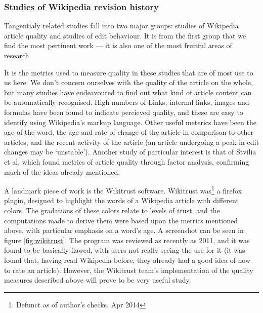 \documentclass[a4paper,11pt,twoside,notitlepage]{article}
\begin{document}
        
        \subsubsection*{Studies of Wikipedia revision history}
        Tangentialy related studies fall into two major groups: studies
        of Wikipedia article quality and studies of edit behaviour.
        It is from the first group that we find the most pertinent
        work --- it is also one of the most fruitful areas of
        research.

        It is the metrics used to measure quality in these studies
        that are of most use to us here. We don't concern ourselves
        with the quality of the article on the whole, but many studies
        have endeavoured to find out what kind of article content can
        be automatically recognised. High numbers of Links, internal
        links, images and formulas have been found to indicate
        percieved quality,\cite{Lucassen2010}\cite{mcguinness2006} and
        these are easy to identify using Wikipedia's markup
        language. Other useful meterics have been the age of the
        word,\cite{Cross2006} the age and rate of change of the
        article in comparison to other articles,\cite{Zeng2006} and
        the recent activity of the article (an article undergoing a
        peak in edit changes may be `unstable').\cite{Adler2006}
        Another study of particular interest is that of Stvilia et al,
        which found metrics of article quality through factor
        analysis,\cite{Stvilia2005} confirming much of the ideas
        already mentioned.

        A landmark piece of work is the Wikitrust
        software.\cite{Adler2007} Wikitrust was\footnote{Defunct as of
          author's checks, Apr 2014} a firefox plugin, designed to
        highlight the words of a Wikipedia article with different
        colors. The gradations of these colors relate to levels of
        trust, and the computations made to derive them were based
        upon the metrics mentioned above, with particular emphasis on
        a word's age. A screenshot can be seen in figure
        \ref{fig:wikitrust}. The program was reviewed as recently as
        2011,\cite{Lucassen2011} and it was found to be basically flawed,
        with users not really seeing the use for it (it was found
        that, having read Wikipedia before, they already had a good
        idea of how to rate an article). However, the Wikitrust team's
        implementation of the quality measures described above will
        prove to be very useful study.
        
\end{document}
